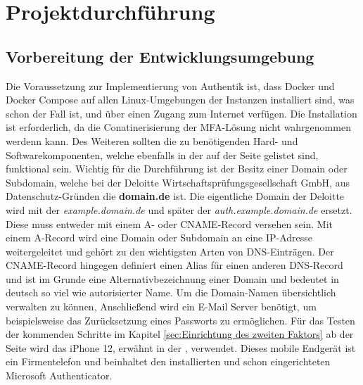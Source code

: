 \section{Projektdurchführung} 
\label{sec:Projektdurchführung}

\subsection{Vorbereitung der Entwicklungsumgebung}
\label{sec:Vorbereitung der Entwicklungsumgebung}
Die Voraussetzung zur Implementierung von Authentik ist, dass Docker und Docker Compose auf allen Linux-Umgebungen der 
Instanzen installiert sind, was schon der Fall ist, und über einen Zugang zum Internet verfügen. Die Installation ist erforderlich, da die 
Conatinerisierung der \acs{MFA}-Lösung nicht wahrgenommen werdenn kann. Des Weiteren sollten die zu 
benötigenden Hard- und Softwarekomponenten, welche ebenfalls in der  auf der Seite \pageref{sec:Sachmittelplanung} 
gelistet sind, funktional sein. Wichtig für die Durchführung ist der Besitz einer Domain oder Subdomain, welche bei der Deloitte 
Wirtschaftsprüfungsgesellschaft GmbH, aus Datenschutz-Gründen die \textbf{domain.de} ist. 
Die eigentliche Domain der Deloitte wird mit der \textit{example.domain.de} und später der \textit{auth.example.domain.de} ersetzt.
Diese muss entweder mit einem \acs{A}- oder \acs{CNAME}-Record versehen sein. Mit einem \acs{A}-Record wird eine Domain oder Subdomain an eine 
IP-Adresse weitergeleitet und gehört zu den wichtigsten Arten von \acs{DNS}-Einträgen. Der \acs{CNAME}-Record hingegen definiert einen Alias für einen 
anderen \acs{DNS}-Record und ist im Grunde eine Alternativbezeichnung einer Domain und bedeutet in deutsch so viel wie 
autorisierter Name. Um die Domain-Namen übersichtlich verwalten zu können, Anschließend wird ein E-Mail Server benötigt, um beispielsweise das 
Zurücksetzung eines Passworts zu ermöglichen. Für das Testen der kommenden Schritte im Kapitel 
\ref{sec:Einrichtung des zweiten Faktors}  ab der Seite 
\pageref{sec:Einrichtung des zweiten Faktors} wird das iPhone 12, erwähnt in der , verwendet. 
Dieses mobile Endgerät ist ein Firmentelefon und beinhaltet den installierten und schon eingerichteten Microsoft Authenticator. 

